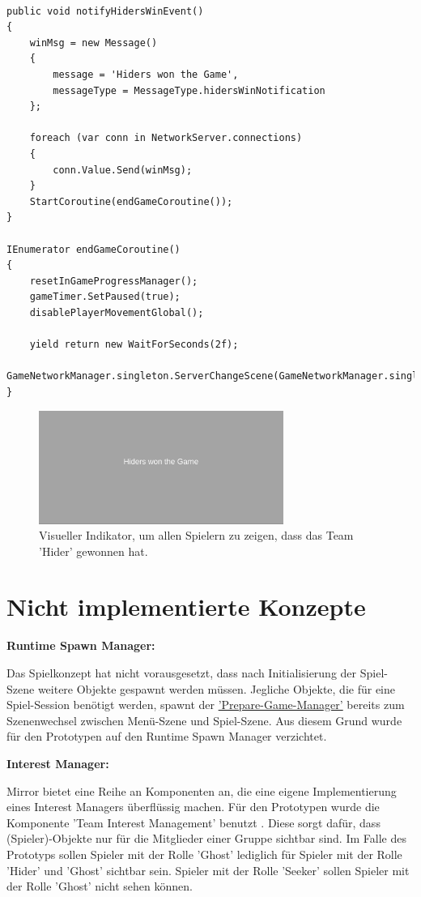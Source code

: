 \begin{lstlisting}[caption= InGameProgressManager.cs Win Event]
	
public void notifyHidersWinEvent()
{
	winMsg = new Message()
	{
		message = 'Hiders won the Game',
		messageType = MessageType.hidersWinNotification
	};
		
	foreach (var conn in NetworkServer.connections)
	{
		conn.Value.Send(winMsg);
	}	
	StartCoroutine(endGameCoroutine());
}

IEnumerator endGameCoroutine()
{
	resetInGameProgressManager();
	gameTimer.SetPaused(true);
	disablePlayerMovementGlobal();
	
	yield return new WaitForSeconds(2f);
	GameNetworkManager.singleton.ServerChangeScene(GameNetworkManager.singleton.offlineScene);
}

\end{lstlisting}

\begin{figure}[H]
	\centering
	\includegraphics[width=80mm]{images/prototyp_hiders_won.png}
	\caption[Hiders won the game]{Visueller Indikator, um allen Spielern zu zeigen, dass das Team 'Hider' gewonnen hat.}
	\label{pic:prototyp_hiders_won}
\end{figure}

\section{Nicht implementierte Konzepte}
\textbf{Runtime Spawn Manager:}

Das Spielkonzept hat nicht vorausgesetzt, dass nach Initialisierung der Spiel-Szene weitere Objekte gespawnt werden müssen. Jegliche Objekte, die für eine Spiel-Session benötigt werden, spawnt der \hyperref[Implementierung:prepare_game_manager]{'Prepare-Game-Manager'} bereits zum Szenenwechsel zwischen Menü-Szene und Spiel-Szene. Aus diesem Grund wurde für den Prototypen auf den Runtime Spawn Manager verzichtet.

\textbf{Interest Manager:}

Mirror bietet eine Reihe an Komponenten an, die eine eigene Implementierung eines Interest Managers überflüssig machen. Für den Prototypen wurde die Komponente 'Team Interest Management' benutzt \cite{.17.02.2022b}. Diese sorgt dafür, dass (Spieler)-Objekte nur für die Mitglieder einer Gruppe sichtbar sind. Im Falle des Prototyps sollen Spieler mit der Rolle 'Ghost' lediglich für Spieler mit der Rolle 'Hider' und 'Ghost' sichtbar sein. Spieler mit der Rolle 'Seeker' sollen Spieler mit der Rolle 'Ghost' nicht sehen können.

